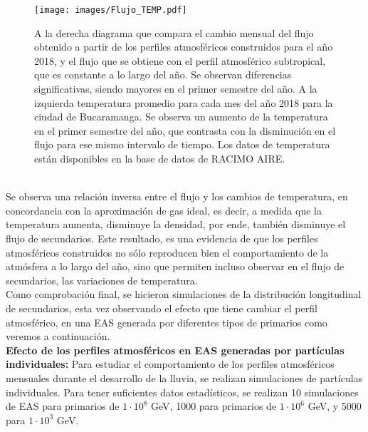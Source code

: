 \begin{figure}[htb!]
\centering
\texttt{[image: images/Flujo\_TEMP.pdf]}
\caption[Comparación del flujo, atmósferas mensuales vs perfil predeterminado.]{A la derecha diagrama que compara el cambio mensual del flujo obtenido a partir de los perfiles atmosféricos construidos para el año 2018, y el flujo que se obtiene con el perfil atmosférico subtropical, que es constante a lo largo del año. Se observan diferencias significativas, siendo mayores en el primer semestre del año. A la izquierda temperatura promedio para cada mes del año 2018 para la ciudad de Bucaramanga. Se observa un aumento de la temperatura en el primer semestre del año, que contrasta con la disminución en el flujo para ese mismo intervalo de tiempo. Los datos de temperatura están disponibles en la base de datos de RACIMO AIRE. \cite{Datos}}
\label{fig:fig21}
\end{figure}\\%
Se observa una relación inversa entre el flujo y los cambios de temperatura, en concordancia con la aproximación de gas ideal, es decir, a medida que la temperatura aumenta, disminuye la densidad, por ende, también disminuye el flujo de secundarios. Este resultado, es una evidencia de que los perfiles atmosféricos construidos no sólo reproducen bien el comportamiento de la atmósfera a lo largo del año, sino que permiten incluso observar en el flujo de secundarios, las variaciones de temperatura. \\

Como comprobación final, se hicieron simulaciones de la distribución longitudinal de secundarios, esta vez observando el efecto que tiene cambiar el perfil atmosférico, en una EAS generada por diferentes tipos de primarios como veremos a continuación.\\

\textbf{Efecto de los perfiles atmosféricos en EAS generadas por partículas individuales:} Para estudiar el comportamiento de los perfiles atmosféricos mensuales durante el desarrollo de la lluvia, se realizan simulaciones de partículas individuales. Para tener suficientes datos estadísticos, se realizan  10 simulaciones de EAS para primarios de $1\cdot 10^{8}$ GeV, 1000 para primarios de $1\cdot 10^{6}$ GeV, y 5000 para $1\cdot 10^{3}$ GeV.\\

